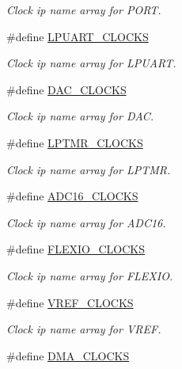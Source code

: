 \begin{DoxyCompactItemize}
\begin{DoxyCompactList}\small\item\em Clock ip name array for P\+O\+RT. \end{DoxyCompactList}\item 
\#define \mbox{\hyperlink{group__clock_ga730b16f643093a12a48361fd00382eb0}{L\+P\+U\+A\+R\+T\+\_\+\+C\+L\+O\+C\+KS}}
\begin{DoxyCompactList}\small\item\em Clock ip name array for L\+P\+U\+A\+RT. \end{DoxyCompactList}\item 
\#define \mbox{\hyperlink{group__clock_gab3c8a974e25f615fe023579c847fae6c}{D\+A\+C\+\_\+\+C\+L\+O\+C\+KS}}
\begin{DoxyCompactList}\small\item\em Clock ip name array for D\+AC. \end{DoxyCompactList}\item 
\#define \mbox{\hyperlink{group__clock_gab37faf7ae1a03862fd7e9b501e7e41ef}{L\+P\+T\+M\+R\+\_\+\+C\+L\+O\+C\+KS}}
\begin{DoxyCompactList}\small\item\em Clock ip name array for L\+P\+T\+MR. \end{DoxyCompactList}\item 
\#define \mbox{\hyperlink{group__clock_ga222774f8b22a83bd1d4bde253be13eba}{A\+D\+C16\+\_\+\+C\+L\+O\+C\+KS}}
\begin{DoxyCompactList}\small\item\em Clock ip name array for A\+D\+C16. \end{DoxyCompactList}\item 
\#define \mbox{\hyperlink{group__clock_gad3726b58af9ad0aa5b01a28f116957db}{F\+L\+E\+X\+I\+O\+\_\+\+C\+L\+O\+C\+KS}}
\begin{DoxyCompactList}\small\item\em Clock ip name array for F\+L\+E\+X\+IO. \end{DoxyCompactList}\item 
\#define \mbox{\hyperlink{group__clock_gadada275d718274d382e3488eebb46d04}{V\+R\+E\+F\+\_\+\+C\+L\+O\+C\+KS}}
\begin{DoxyCompactList}\small\item\em Clock ip name array for V\+R\+EF. \end{DoxyCompactList}\item 
\#define \mbox{\hyperlink{group__clock_ga5a8ba9cbce79bf443b2b1ba97d4c5475}{D\+M\+A\+\_\+\+C\+L\+O\+C\+KS}}

\end{DoxyCompactItemize}
